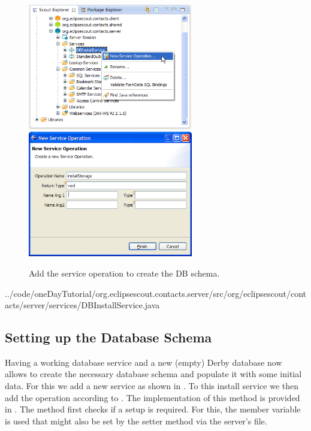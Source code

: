 \documentclass[a4paper,10pt,twoside]{book}
\begin{document}
\begin{figure}
\includegraphics[height=5.5cm]{new_operation_installstorage_contextmenu.png} \hspace{5mm}
\includegraphics[height=5.5cm]{new_operation_installstorage.png} 
\caption{Add the service operation to create the DB schema. }
\end{figure}



{../code/oneDayTutorial/org.eclipsescout.contacts.server/src/org/eclipsescout/contacts/server/services/DBInstallService.java}

\subsection{Setting up the Database Schema}

Having a working database service and a new (empty) Derby database now allows to create the necessary database schema and populate it with some initial data.
For this we add a new  service as shown in .
To this install service we then add the  operation according to .
The implementation of this method is provided in .
The method first checks if a setup is required. 
For this, the member variable  is used that might also be set by the  setter method via the server's  file.
\end{document}
